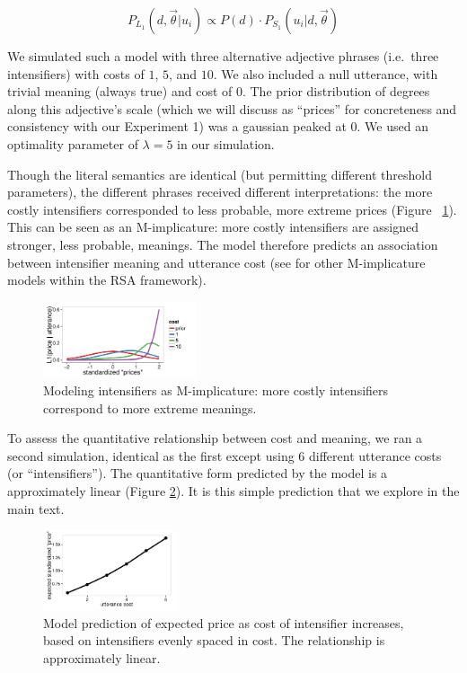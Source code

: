 $$ P_{L_1}(d, \vec{\theta} | u_i) \propto P(d) \cdot P_{S_1}(u_i | d, \vec{\theta}) $$

We simulated such a model with three alternative adjective phrases (i.e.~three intensifiers) with costs of $1$, $5$, and $10$. We also included a null utterance, with trivial meaning (always true) and cost of $0$. The prior distribution of degrees along this adjective's scale (which we will discuss as ``prices'' for concreteness and consistency with our Experiment 1) was a gaussian peaked at $0$.
We used an optimality parameter of $\lambda=5$ in our simulation. 

Though the literal semantics are identical (but permitting different threshold parameters), the different phrases received different interpretations: the more costly intensifiers corresponded to less probable, more extreme prices (Figure ~\ref{model}).
This can be seen as an M-implicature: more costly intensifiers are assigned stronger, less probable, meanings. 
The model therefore predicts an association between intensifier meaning and utterance cost (see  for other M-implicature models within the RSA framework).


\begin{figure}[htb]
\begin{center}
\includegraphics[width=0.4\textwidth]{model_results.pdf}
\end{center}
\caption{Modeling intensifiers as M-implicature: more costly intensifiers correspond to more extreme meanings.} 
\label{model}
\end{figure}

To assess the quantitative relationship between cost and meaning, we ran a second simulation, identical as the first except using 6 different utterance costs (or ``intensifiers'').
The quantitative form predicted by the model is a approximately linear (Figure \ref{model-heights}).
It is this simple prediction that we explore in the main text.


\begin{figure}[htb]
\begin{center}\includegraphics[width=0.35\textwidth]{height-by-cost.pdf}
\end{center}
\caption{Model prediction of expected price as cost of intensifier increases, based on intensifiers evenly spaced in cost. The relationship is approximately linear.} 
\label{model-heights}
\end{figure}


